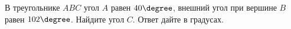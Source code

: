 \begin{ex}
	\begin{condition}
		В треугольнике \( ABC \) угол \( A \) равен \( 40 \degree\), внешний угол при вершине \( B \) равен \( 102 \degree\). Найдите угол \( C \). Ответ дайте в градусах.
	\end{condition}
\end{ex}